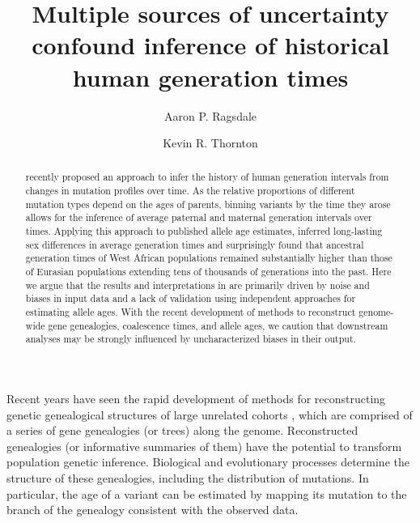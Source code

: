 \documentclass[]{article}
\title{Multiple sources of uncertainty confound inference of
historical human generation times}
\author[1,*]{Aaron P. Ragsdale}
\author[2]{Kevin R. Thornton}
\affil[1]{University of Wisconsin--Madison, Wisconsin, USA}
\affil[2]{University of California, Irvine, California, USA}
\affil[*]{apragsdale@wisc.edu}
\begin{document}
\maketitle

\begin{abstract}

    \noindent \citet{wang2023human} recently proposed an approach to infer the
    history of human generation intervals from changes in mutation profiles
    over time. As the relative proportions of different mutation types depend
    on the ages of parents, binning variants by the time they arose allows for
    the inference of average paternal and maternal generation intervals over
    times. Applying this approach to published allele age estimates,
    \citet{wang2023human} inferred long-lasting sex differences in average
    generation times and surprisingly found that ancestral generation times of
    West African populations remained substantially higher than those of
    Eurasian populations extending tens of thousands of generations into the
    past. Here we argue that the results and interpretations in
    \citet{wang2023human} are primarily driven by noise and biases in input
    data and a lack of validation using independent approaches for estimating
    allele ages. With the recent development of methods to reconstruct
    genome-wide gene genealogies, coalescence times, and allele ages, we
    caution that downstream analyses may be strongly influenced by
    uncharacterized biases in their output.

\end{abstract}

Recent years have seen the rapid development of methods for reconstructing
genetic genealogical structures of large unrelated cohorts
\citep{speidel2019method,wohns2022unified,hubisz2020mapping}, which are
comprised of a series of gene genealogies (or trees) along the genome.
Reconstructed genealogies (or informative summaries of them) have the potential
to transform population genetic inference. Biological and evolutionary
processes determine the structure of these genealogies, including the
distribution of mutations. In particular, the age of a variant can be estimated
by mapping its mutation to the branch of the genealogy consistent with the
observed data.
\end{document}
